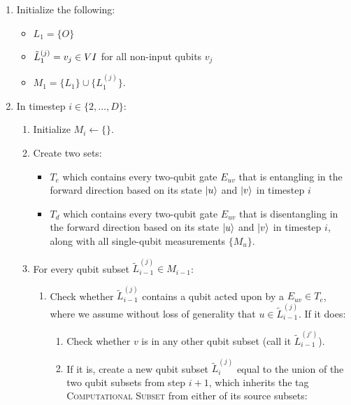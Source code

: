 \begin{enumerate}
\item
Initialize the following:
\begin{itemize}
\item
$L_1 = \{ O \}$
\item
$\tilde{L}^{(j)}_1 = v_j \in V \\ I$ for all non-input qubits $v_j$
\item
$M_1 = \{ L_1 \} \cup \{ L^{(j)}_1 \}$.
\end{itemize}

\item
In timestep $i \in \{2, \ldots, D \}$:

\begin{enumerate}

\item
Initialize $M_i \leftarrow \{\}$.
\item
Create two sets:
\begin{itemize}
\item $T_e$ which contains every two-qubit
gate $E_{uv}$ that is entangling in the forward direction based on
its state $\left\vert{u}\right\rangle$ and $\left\vert{v}\right\rangle$ in timestep $i$
\item $T_d$ which contains every two-qubit
gate $E_{uv}$ that is disentangling in the forward direction
 based on
its state $\left\vert{u}\right\rangle$ and $\left\vert{v}\right\rangle$ in timestep $i$,
along with all single-qubit measurements $\{ M_u \}$.
\end{itemize}

\item
For every qubit subset $\tilde{L}^{(j)}_{i-1} \in M_{i-1}$:

\begin{enumerate}
\item Check whether $\tilde{L}^{(j)}_{i-1}$ contains a qubit acted upon by a
$E_{uv} \in T_e$, where we assume without loss of generality that
$u \in \tilde{L}^{(j)}_{i-1}$. If it does:

\begin{enumerate}
\item Check whether $v$ is in any other qubit subset
(call it $\tilde{L}^{(j')}_{i-1}$).

\item
If it is, create a new qubit subset
$\tilde{L}^{(j)}_{i}$ equal to the union of the two qubit subsets from
step $i+1$, which inherits the tag \textsc{Computational Subset} from
either of its source subsets:


\end{enumerate}
\end{enumerate}
\end{enumerate}
\end{enumerate}
